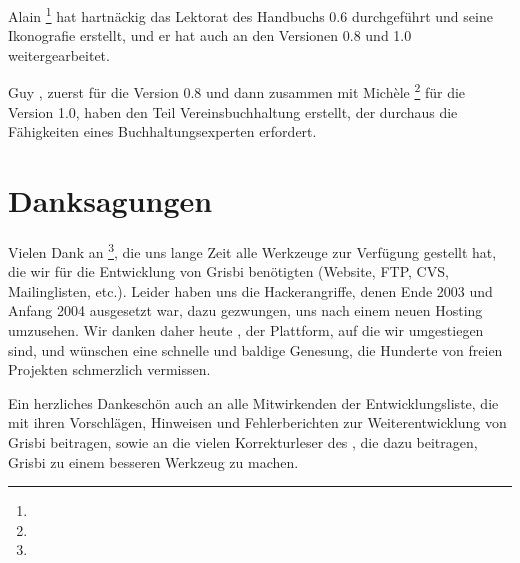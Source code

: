 {%
Alain \footnote{\urlAlainLetientEmail{}} hat hartnäckig das Lektorat des Handbuchs 0.6 durchgeführt und seine Ikonografie erstellt, und er hat auch an den Versionen 0.8 und 1.0 weitergearbeitet.

Guy , zuerst für die Version 0.8 und dann zusammen mit Michèle \footnote{\urlMicheleBondilEmail{}} für die Version 1.0, haben den Teil Vereinsbuchhaltung erstellt, der durchaus die Fähigkeiten eines Buchhaltungsexperten erfordert.

\section{Danksagungen\label{introduction-thanks}}


Vielen Dank an \footnote{\urlTuxFamily{}}, die uns lange Zeit alle Werkzeuge zur Verfügung gestellt hat, die wir für die Entwicklung von Grisbi benötigten (Website, FTP, CVS, Mailinglisten, etc.). Leider haben uns die Hackerangriffe, denen  Ende 2003 und Anfang 2004 ausgesetzt war, dazu gezwungen, uns nach einem neuen Hosting umzusehen. Wir danken daher heute , der Plattform, auf die wir umgestiegen sind, und wünschen  eine schnelle und baldige Genesung, die Hunderte von freien Projekten schmerzlich vermissen.

Ein herzliches Dankeschön auch an alle Mitwirkenden der Entwicklungsliste, die mit ihren Vorschlägen, Hinweisen und Fehlerberichten zur Weiterentwicklung von Grisbi beitragen, sowie an die vielen Korrekturleser des , die dazu beitragen, Grisbi zu einem besseren Werkzeug zu machen.

}
